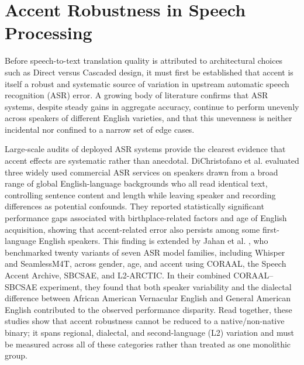\section{Accent Robustness in Speech Processing}
\label{sec:accent-asr}

Before speech-to-text translation quality is attributed to architectural
choices such as Direct versus Cascaded design, it must first be established
that accent is itself a robust and systematic source of variation in upstream
automatic speech recognition (ASR) error. A growing body of literature confirms
that ASR systems, despite steady gains in aggregate accuracy, continue to
perform unevenly across speakers of different English varieties, and that this
unevenness is neither incidental nor confined to a narrow set of edge cases.

Large-scale audits of deployed ASR systems provide the clearest evidence that
accent effects are systematic rather than anecdotal. DiChristofano et al.
\cite{dichristofano2022global} evaluated three widely used commercial ASR
services on speakers drawn from a broad range of global English-language
backgrounds who all read identical text, controlling sentence content and
length while leaving speaker and recording differences as potential
confounds. They reported statistically significant performance gaps associated
with birthplace-related factors and age of English acquisition, showing that
accent-related error also persists among some first-language English speakers.
This finding is extended by Jahan et al. \cite{jahan2025unveiling}, who
benchmarked twenty variants of seven ASR model families, including Whisper and
SeamlessM4T, across gender, age, and accent using CORAAL, the Speech Accent
Archive, SBCSAE, and L2-ARCTIC. In their combined CORAAL--SBCSAE experiment,
they found that both speaker variability and the dialectal difference between
African American Vernacular English and General American English contributed
to the observed performance disparity. Read together, these studies show that
accent robustness cannot be reduced to a native/non-native binary; it spans
regional, dialectal, and second-language (L2) variation and must be measured
across all of these categories rather than treated as one monolithic group.

